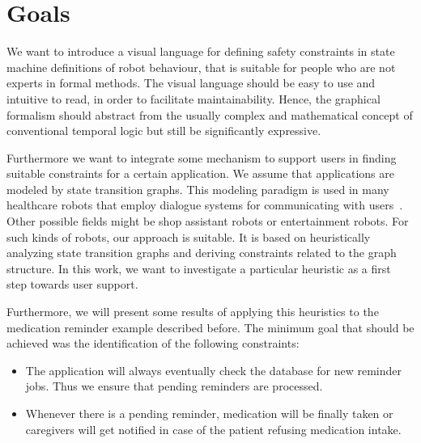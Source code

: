 \documentclass[conference]{IEEEtran}
\begin{document}
\section{Goals}
\label{sec:requirements}


We want to introduce a visual language for defining safety constraints in state machine definitions of robot behaviour, that is suitable for people who are not experts in formal methods. The visual language should be easy to use and intuitive to read, in order to facilitate maintainability.
Hence, the graphical formalism should abstract from the usually complex and mathematical concept of conventional temporal logic but still be significantly expressive.
 
Furthermore we want to integrate some mechanism to support users in finding suitable constraints for a certain application. We assume that applications are modeled by state transition graphs. This modeling paradigm is used in many healthcare robots that employ dialogue systems for communicating with users~\cite{Bickmore2006}. Other possible fields might be shop assistant robots or entertainment robots. For such kinds of robots, our approach is suitable. It is based on heuristically analyzing state transition graphs and deriving constraints related to the graph structure. In this work, we want to investigate a particular heuristic as a first step towards user support. 

Furthermore, we will present some results of applying this heuristics to the medication reminder example described before. The minimum goal that should be achieved was the identification of the following constraints:

\begin{itemize}
	\item The application will always eventually check the database for new reminder jobs. Thus we ensure that pending reminders are processed.
	\item Whenever there is a pending reminder, medication will be finally taken or caregivers will get notified in case of the patient refusing medication intake.
\end{itemize}
\end{document}
